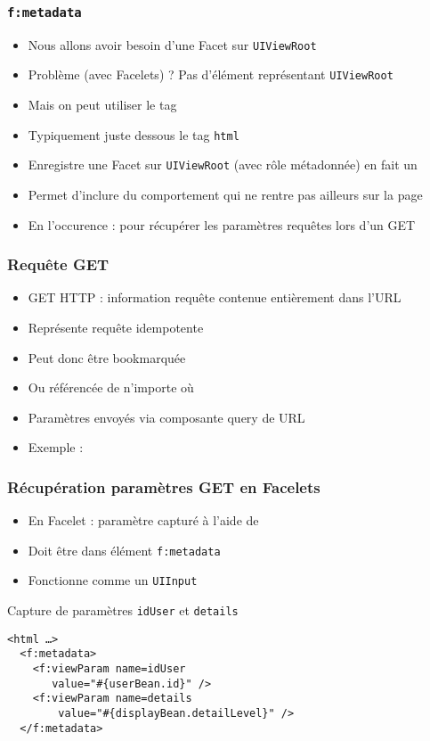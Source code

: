 \documentclass[english, french]{beamer}
\begin{document}
\begin{frame}
	\frametitle{\texttt{f:metadata}}
	\begin{itemize}
		\item Nous allons avoir besoin d’une Facet sur \texttt{UIViewRoot}
		\item Problème (avec Facelets) ? \pause Pas d’élément représentant \texttt{UIViewRoot} \pause
		\item Mais on peut utiliser le tag 
		\item {\tiny Typiquement} juste dessous le tag \texttt{html}
		\item Enregistre une Facet sur \texttt{UIViewRoot} (avec rôle métadonnée) {\tiny en fait un }
		\item Permet d’inclure du comportement qui ne rentre pas ailleurs sur la page
		\item En l’occurence : pour récupérer les paramètres requêtes lors d’un GET
	\end{itemize}
\end{frame}

\begin{frame}
	\frametitle{Requête GET}
	\begin{itemize}
		\item GET HTTP : information requête contenue entièrement dans l’URL
		\item Représente requête idempotente
		\item Peut donc être \og{}bookmarquée\fg{}
		\item Ou référencée de n’importe où
		\item Paramètres envoyés via composante \og{}query{} de URL
		\item Exemple : 
	\end{itemize}
\end{frame}

\begin{frame}[fragile]
	\frametitle{Récupération paramètres GET en Facelets}
	\begin{itemize}
		\item En Facelet : paramètre capturé à l’aide de 
		\item Doit être dans élément \texttt{f:metadata}
		\item Fonctionne comme un \texttt{UIInput}
	\end{itemize}
	\begin{exampleblock}{Capture de paramètres \texttt{idUser} et \texttt{details}}
		\begin{lstlisting}
<html …>
  <f:metadata>
    <f:viewParam name=idUser
       value="#{userBean.id}" />
    <f:viewParam name=details
        value="#{displayBean.detailLevel}" />
  </f:metadata>
		\end{lstlisting}
	\end{exampleblock}
\end{frame}
\end{document}

